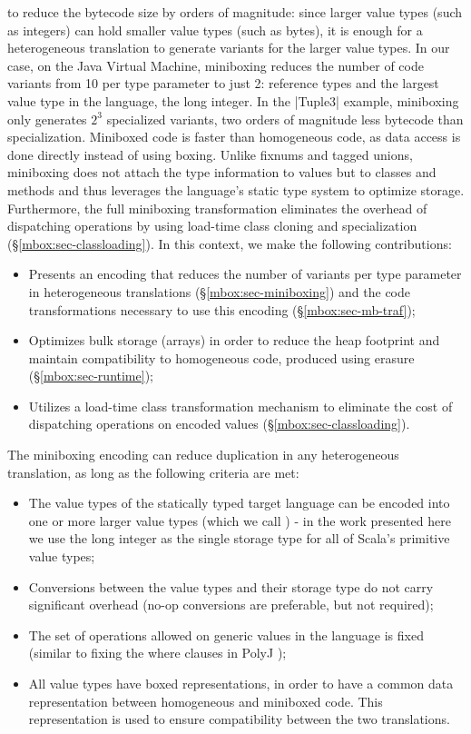  to reduce the bytecode size by orders of magnitude: since larger value types (such as integers) can hold smaller value types (such as bytes), it is enough for a heterogeneous translation to generate variants for the larger value types. In our case, on the Java Virtual Machine, miniboxing reduces the number of code variants from 10 per type parameter to just 2: reference types and the largest value type in the language, the long integer. In the |Tuple3| example, miniboxing only generates $2^3$ specialized variants, two orders of magnitude less bytecode than specialization. Miniboxed code is faster than homogeneous code, as data access is done directly instead of using boxing. Unlike fixnums and tagged unions, miniboxing does not attach the type information to values but to classes and methods and thus leverages the language's static type system to optimize storage. Furthermore, the full miniboxing transformation eliminates the overhead of dispatching operations by using load-time class cloning and specialization (\S\ref{mbox:sec-classloading}). In this context, we make the following contributions:

\begin{itemize}
  \item Presents an encoding that reduces the number of variants per type parameter in heterogeneous translations (\S{}\ref{mbox:sec-miniboxing}) and the code transformations necessary to use this encoding (\S\ref{mbox:sec-mb-traf});
  \item Optimizes bulk storage (arrays) in order to reduce the heap footprint and maintain compatibility to homogeneous code, produced using erasure (\S{}\ref{mbox:sec-runtime});
  \item Utilizes a load-time class transformation mechanism to eliminate the cost of dispatching operations on encoded values (\S{}\ref{mbox:sec-classloading}).
\end{itemize}

The miniboxing encoding can reduce duplication in any heterogeneous translation, as long as the following criteria are met:
\begin{itemize}
  \item The value types of the statically typed target language can be encoded into one or more larger value types (which we call ) - in the work presented here we use the long integer as the single storage type for all of Scala's primitive value types;
  \item Conversions between the value types and their storage type do not carry significant overhead (no-op conversions are preferable, but not required);
  \item The set of operations allowed on generic values in the language is fixed (similar to fixing the where clauses in PolyJ \cite{myers-polyj});
  \item All value types have boxed representations, in order to have a common data representation between homogeneous and miniboxed code. This representation is used to ensure compatibility between the two translations.
\end{itemize}

